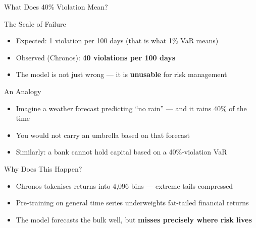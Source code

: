\documentclass[9pt, aspectratio=169, t]{beamer}
\begin{document}
\begin{frame}{What Does 40\% Violation Mean?}
	\vspace{-0.3cm}
	{\footnotesize
	\begin{alertblock}{The Scale of Failure}
		\begin{itemize}\setlength{\itemsep}{1pt}
			\item Expected: 1 violation per 100 days (that is what 1\% VaR means)
			\item Observed (Chronos): \textbf{40 violations per 100 days}
			\item The model is not just wrong --- it is \textbf{unusable} for risk management
		\end{itemize}
	\end{alertblock}
	\vspace{0mm}
	\begin{block}{An Analogy}
		\begin{itemize}\setlength{\itemsep}{1pt}
			\item Imagine a weather forecast predicting ``no rain'' --- and it rains 40\% of the time
			\item You would not carry an umbrella based on that forecast
			\item Similarly: a bank cannot hold capital based on a 40\%-violation VaR
		\end{itemize}
	\end{block}
	\vspace{0mm}
	\begin{alertblock}{Why Does This Happen?}
		\begin{itemize}\setlength{\itemsep}{1pt}
			\item Chronos tokenises returns into 4{,}096 bins --- extreme tails compressed
			\item Pre-training on general time series underweights fat-tailed financial returns
			\item The model forecasts the bulk well, but \textbf{misses precisely where risk lives}
		\end{itemize}
	\end{alertblock}
	}
\end{frame}
\end{document}
